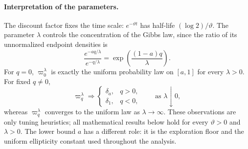 \documentclass[11pt]{article}
\theoremstyle{definition}
\theoremstyle{remark}
\numberwithin{equation}{section}
\begin{document}
\paragraph{Interpretation of the parameters.}
The discount factor fixes the time scale: $e^{-\vartheta t}$ has half-life
$(\log2)/\vartheta$.  The parameter $\lambda$ controls the concentration of the Gibbs law, since
the ratio of its unnormalized endpoint densities is
\begin{equation}\label{eq:lambda-endpoint-calibration}
 \frac{e^{-aq/\lambda}}{e^{-q/\lambda}}
 =\exp\left(\frac{(1-a)q}{\lambda}\right).
\end{equation}
For $q=0$, $\varpi_0^\lambda$ is exactly the uniform probability law on $[a,1]$ for every
$\lambda>0$.  For fixed $q\ne0$,
\begin{equation}\label{eq:lambda-regimes-control}
 \varpi_q^\lambda\Longrightarrow
 \begin{cases}
  \delta_a,&q>0,\\
  \delta_1,&q<0,
 \end{cases}
 \qquad\text{as }\lambda\downarrow0,
\end{equation}
whereas $\varpi_q^\lambda$ converges to the uniform law as $\lambda\to\infty$.
These observations are only tuning heuristics; all mathematical results below hold for every
$\vartheta>0$ and $\lambda>0$.  The lower bound $a$ has a different role: it is the exploration
floor and the uniform ellipticity constant used throughout the analysis.
\end{document}
